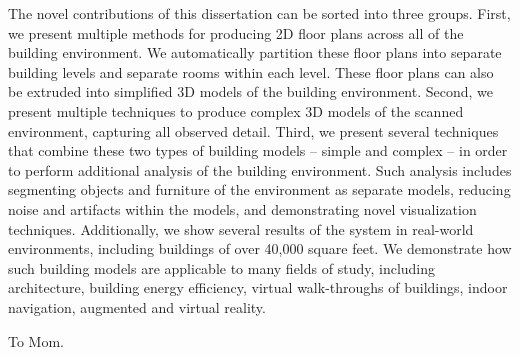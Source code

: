 \documentclass[12pt,onecolumn,oneside]{book}
\begin{document}
The novel contributions of this dissertation can be sorted into three groups.  First, we present multiple methods for producing 2D floor plans across all of the building environment.  We automatically partition these floor plans into separate building levels and separate rooms within each level.  These floor plans can also be extruded into simplified 3D models of the building environment.  Second, we present multiple techniques to produce complex 3D models of the scanned environment, capturing all observed detail.  Third, we present several techniques that combine these two types of building models -- simple and complex -- in order to perform additional analysis of the building environment.  Such analysis includes segmenting objects and furniture of the environment as separate models, reducing noise and artifacts within the models, and demonstrating novel visualization techniques.  Additionally, we show several results of the system in real-world environments, including buildings of over 40,000 square feet.  We demonstrate how such building models are applicable to many fields of study, including architecture, building energy efficiency, virtual walk-throughs of buildings, indoor navigation, augmented and virtual reality.


\newpage
{}
\setcounter{page}{1}

\clearpage
\vspace*{\fill}
\begin{center}
To Mom.
\end{center}
\vfill %
\clearpage

\tableofcontents{}

\cleardoublepage
{}
{}
\listoffigures{}

\end{document}
